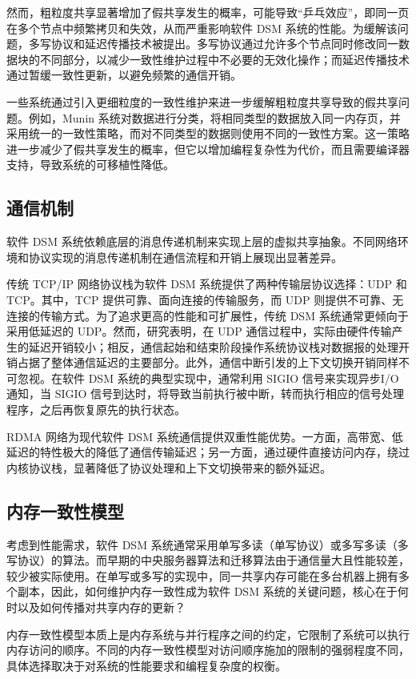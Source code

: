 {然而，粗粒度共享显著增加了假共享发生的概率，可能导致“乒乓效应”，即同一页在多个节点中频繁拷贝和失效，从而严重影响软件 DSM 系统的性能。为缓解该问题，多写协议和延迟传播技术被提出。多写协议通过允许多个节点同时修改同一数据块的不同部分，以减少一致性维护过程中不必要的无效化操作；而延迟传播技术通过暂缓一致性更新，以避免频繁的通信开销。

一些系统通过引入更细粒度的一致性维护来进一步缓解粗粒度共享导致的假共享问题。例如，Munin 系统对数据进行分类，将相同类型的数据放入同一内存页，并采用统一的一致性策略，而对不同类型的数据则使用不同的一致性方案。这一策略进一步减少了假共享发生的概率，但它以增加编程复杂性为代价，而且需要编译器支持，导致系统的可移植性降低。

\subsection{通信机制}
软件 DSM 系统依赖底层的消息传递机制来实现上层的虚拟共享抽象。不同网络环境和协议实现的消息传递机制在通信流程和开销上展现出显著差异。

传统 TCP/IP 网络协议栈为软件 DSM 系统提供了两种传输层协议选择：UDP 和 TCP。其中，TCP 提供可靠、面向连接的传输服务，而 UDP 则提供不可靠、无连接的传输方式。为了追求更高的性能和可扩展性，传统 DSM 系统通常更倾向于采用低延迟的 UDP。然而，研究表明，在 UDP 通信过程中，实际由硬件传输产生的延迟开销较小；相反，通信起始和结束阶段操作系统协议栈对数据报的处理开销占据了整体通信延迟的主要部分。此外，通信中断引发的上下文切换开销同样不可忽视。在软件 DSM 系统的典型实现中，通常利用 SIGIO 信号来实现异步I/O通知，当 SIGIO 信号到达时，将导致当前执行被中断，转而执行相应的信号处理程序，之后再恢复原先的执行状态。

RDMA 网络为现代软件 DSM 系统通信提供双重性能优势。一方面，高带宽、低延迟的特性极大的降低了通信传输延迟；另一方面，通过硬件直接访问内存，绕过内核协议栈，显著降低了协议处理和上下文切换带来的额外延迟。

\subsection{内存一致性模型}
考虑到性能需求，软件 DSM 系统通常采用单写多读（单写协议）或多写多读（多写协议）的算法。而早期的中央服务器算法和迁移算法由于通信量大且性能较差，较少被实际使用。在单写或多写的实现中，同一共享内存可能在多台机器上拥有多个副本，因此，如何维护内存一致性成为软件 DSM 系统的关键问题，核心在于何时以及如何传播对共享内存的更新？

内存一致性模型本质上是内存系统与并行程序之间的约定，它限制了系统可以执行内存访问的顺序。不同的内存一致性模型对访问顺序施加的限制的强弱程度不同，具体选择取决于对系统的性能要求和编程复杂度的权衡。

}
